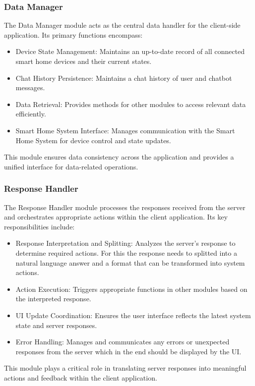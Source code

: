 \subsubsection{Data Manager}
The Data Manager module acts as the central data handler for the client-side application. Its primary functions encompass:
\begin{itemize}
    \item Device State Management: Maintains an up-to-date record of all connected smart home devices and their current states.
    \item Chat History Persistence: Maintains a chat history of user and chatbot messages.
    \item Data Retrieval: Provides methods for other modules to access relevant data efficiently.
    \item Smart Home System Interface: Manages communication with the Smart Home System for device control and state updates.
\end{itemize}
This module ensures data consistency across the application and provides a unified interface for data-related operations.

\subsubsection{Response Handler}
The Response Handler module processes the responses received from the server and orchestrates appropriate actions within the client application. Its key responsibilities include:
\begin{itemize}
    \item Response Interpretation and Splitting: Analyzes the server's response to determine required actions. For this the response needs to splitted into a natural language answer and a format that can be transformed into system actions.
    \item Action Execution: Triggers appropriate functions in other modules based on the interpreted response.
    \item UI Update Coordination: Ensures the user interface reflects the latest system state and server responses.
    \item Error Handling: Manages and communicates any errors or unexpected responses from the server which in the end should be displayed by the UI.
\end{itemize}
This module plays a critical role in translating server responses into meaningful actions and feedback within the client application.

